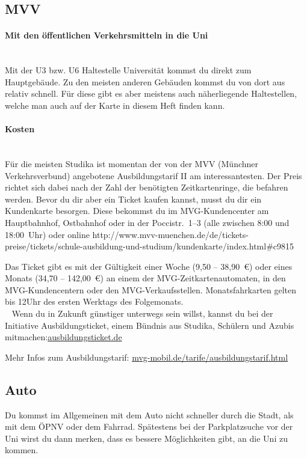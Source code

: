 
\clearpage

\subsection{MVV}

\paragraph{Mit den öffentlichen Verkehrsmitteln in die Uni}\hfill\\
Mit der U3 bzw. U6 Haltestelle Universität kommst du direkt zum Hauptgebäude. Zu den meisten anderen Gebäuden kommst du von dort aus relativ schnell. Für diese gibt es aber meistens auch näherliegende Haltestellen, welche man auch auf der Karte in diesem Heft finden kann.

\paragraph{Kosten}\hfill\\
Für die meisten Studika ist momentan der von der MVV (Münchner Verkehrsverbund) angebotene Ausbildungstarif II am interessantesten. Der Preis richtet sich dabei nach der Zahl der benötigten Zeitkartenringe, die befahren werden. Bevor du dir aber ein Ticket kaufen kannst, musst du dir ein Kundenkarte besorgen. Diese bekommst du im MVG-Kundencenter am Hauptbahnhof, Ostbahnhof oder in der Poccistr.~1--3 (alle zwischen 8:00 und 18:00~Uhr) oder online \newline http://www.mvv-muenchen.de/de/tickets-preise/tickets/schule-ausbildung-und-studium/\newline kundenkarte/index.html\#c9815

Das Ticket gibt es mit der Gültigkeit einer Woche (9,50 -- 38,90~€) oder eines Monats (34,70 -- 142,00~€) an einem der MVG-Zeitkartenautomaten, in den MVG-Kundencentern oder den MVG-Verkaufsstellen. Monatsfahrkarten gelten bis 12Uhr des ersten Werktags des Folgemonats.\\
~
Wenn du in Zukunft günstiger unterwegs sein willst, kannst du bei der Initiative Ausbildungsticket, einem Bündnis aus Studika, Schülern und Azubis mitmachen:\newline \url{ausbildungsticket.de}

Mehr Infos zum Ausbildungstarif: \url{mvg-mobil.de/tarife/ausbildungstarif.html}


\subsection{Auto}
Du kommst im Allgemeinen mit dem Auto nicht schneller durch die Stadt, als mit dem ÖPNV oder dem Fahrrad. Spätestens bei der Parkplatzsuche vor der Uni wirst du dann merken, dass es bessere Möglichkeiten gibt, an die Uni zu kommen.
